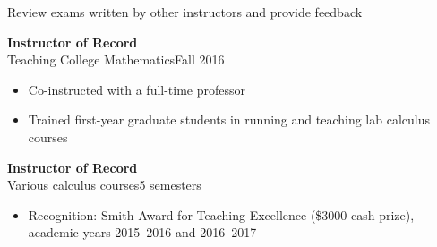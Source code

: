 \documentclass[11pt]{article}
\newcommand{\textsb}[1]{{\fontseries{sb}\selectfont #1}}
\newcommand{\thingleft}[5] {
  {\titlesize \textbf{#1}}\hfill#2\\
  \textsb{#3}\hfill#4

  {\small
    \begin{itemize}
      #5
    \end{itemize}
  }
}
\def\colheight{58.0em}%
\def\leftcolwidth{.375\textwidth}
\newcommand{\titlesize}{\large} %
\begin{document}
{\begin{minipage}[t][\colheight]{\leftcolwidth}
{      \item Review exams written by other instructors and provide feedback
    }

  \vfill

  \thingleft
    {Instructor of Record}
    {}
    {Teaching College Mathematics}
    {Fall 2016}
    {
      \item Co-instructed with a full-time professor

      \item Trained first-year graduate students in running and teaching lab
      calculus courses
    }

  \vfill

  \thingleft
    {Instructor of Record}
    {}
    {Various calculus courses}
    {5 semesters}
    {
      \item \textsb{Recognition:} Smith Award for Teaching Excellence (\$3000
      cash prize), academic years 2015--2016 and 2016--2017\vphantom{,p)}
    }

\end{minipage}
} %
%
\hfill
%
%
\end{document}
